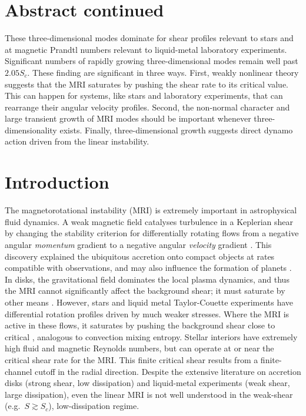 \documentclass[openacc]{rsproca_new}%
\begin{document}
\section{Abstract continued}
These three-dimensional modes dominate for shear profiles relevant to stars and at magnetic Prandtl numbers relevant to liquid-metal laboratory experiments.
Significant numbers of rapidly growing three-dimensional modes remain well past $2.05S_{c}$. 
These finding are significant in three ways. 
First, weakly nonlinear theory suggests that the MRI saturates by pushing the shear rate to its critical value. 
This can happen for systems, like stars and laboratory experiments, that can rearrange their angular velocity profiles.
Second, the non-normal character and large transient growth of MRI modes should be important whenever three-dimensionality exists.
Finally, three-dimensional growth suggests direct dynamo action driven from the linear instability.

\section{Introduction}
The magnetorotational instability (MRI) is extremely important in astrophysical fluid dynamics.
A weak magnetic field catalyses turbulence in a Keplerian shear by changing the stability criterion for differentially rotating flows from a negative angular \emph{momentum} gradient to a negative angular \emph{velocity} gradient \cite{1998RvMP...70....1B,2010RSPTA.368.1607J}.
This discovery explained the ubiquitous accretion onto compact objects at rates compatible with observations, and may also influence the formation of planets \cite{2007Natur.448.1022J}.
In disks, the gravitational field dominates the local plasma dynamics, and thus the MRI cannot significantly affect the background shear; it must saturate by other means \cite{2018MNRAS.474.3451X}.
However, stars and liquid metal Taylor-Couette experiments have differential rotation profiles driven by much weaker stresses.
Where the MRI is active in these flows, it saturates by pushing the background shear close to critical \cite{2015RSPSA.47140699V,2017ApJ...841....1C,2017ApJ...841....2C}, analogous to convection mixing entropy.
Stellar interiors have extremely high fluid and magnetic Reynolds numbers, but can operate at or near the critical shear rate for the MRI.
This finite critical shear results from a finite-channel cutoff in the radial direction.
Despite the extensive literature on accretion disks (strong shear, low dissipation) and liquid-metal experiments (weak shear, large dissipation), even the linear MRI is not well understood in the weak-shear (e.g.\ $S \gtrsim S_c$), low-dissipation regime. 
\end{document}
